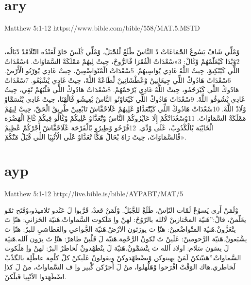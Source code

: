\documentclass[12pt,fleqn,titlepage,twoside,a4paper]{book}
\begin{document}
\section{ary}

Matthew 5:1-12 https://www.bible.com/bible/558/MAT.5.MSTD

\begin{arab}[utf]
\section*{}


وْمْلِّي شَافْ يَسُوعْ الجّْمَاعَاتْ دْ النَّاسْ طْلَعْ لْلجّْبَلْ، وْمْلِّي ݣْلَسْ جَاوْ لْعَنْدُه التّْلَامْدْ دْيَالُه، 2وْبْدَا كَيْعَلّْمْهُمْ وْݣَالْ:
3«سْعْدَاتْ الْفُقَرَا فْالرُّوحْ،
حِيتْ لِيهُمْ مَمْلَكَةْ السَّمَاوَاتْ.
4سْعْدَاتْ اللِّي كَيْبْكِيوْ، حِيتْ اللَّهْ غَادِي يْوَاسِيهُمْ.
5سْعْدَاتْ الْمْتْوَاضْعِينْ، حِيتْ غَادِي يْوَرْتُو الْأَرْضْ.
6سْعْدَاتْ هَادُوكْ اللِّي جِيعَانِينْ وْعْطْشَانِينْ لْطَاعْةْ اللَّهْ، حِيتْ غَادِي يْشْبْعُو.
7سْعْدَاتْ هَادُوكْ اللِّي كَيْرَحْمُو، حِيتْ اللَّهْ غَادِي يْرْحَمْهُمْ.
8سْعْدَاتْ هَادُوكْ اللِّي قَلْبْهُمْ نْقِي، حِيتْ غَادِي يْشُوفُو اللَّهْ.
9سْعْدَاتْ هَادُوكْ اللِّي كَيْعَاوْنُو النَّاسْ يْعِيشُو فْالْهْنَا، حِيتْ غَادِي يْتْسَمَّاوْ وْلَادْ اللَّهْ.
10سْعْدَاتْ هَادُوكْ اللِّي كَيْتّْعَدَّاوْ عْلِيهُمْ عْلَاحْقَّاشْ تَابْعِينْ طْرِيقْ الْحَقّْ، حِيتْ لِيهُمْ مَمْلَكَةْ السَّمَاوَاتْ.
11وْسْعْدَاتْكُمْ إِلَا عَايْرُوكُمْ النَّاسْ وْتّْعَدَّاوْ عْلِيكُمْ وْݣَالُو فِيكُمْ ݣَاعْ الْهَضْرَة الْخَايْبَة بْالْكْدُوبْ، عْلَى وْدِّي. 12فْرْحُو وْطِيرُو بْالْفَرْحَة عْلَاحْقَّاشْ أَجْرْكُمْ عْظِيمْ فْالسَّمَاوَاتْ، حِيتْ رَاهْ بْحَالْ هَكَّا تْعَدَّاوْ عْلَى الْأَنْبِيَا اللِّي قْبَلْ مْنّْكُمْ».
\end{arab}

\section{ayp}

Matthew 5:1-12 http://live.bible.is/bible/AYPABT/MAT/5

\begin{arab}[utf]

وْلَمَنْ أَرى يَسوُعْ لَمّات النّاِسْ، طَلَعْ للجَّبَلْ. وْلَمَنْ قعدْ، قَرَّبوا لَ عَنْدو تَلاميذو،وْفَتَح ثمّو يعَلّمنْ، قالْ:”هَنيّة المحْتازينْ لَالله بالرّوُحْ: لهنْ واِ مَلَكوت السَّماواتْ.هَنيّة الحَزانىِ: هنّاِ تَ يتْعَزَّونْ.هَنيّة المتْواضْعينْ: هنّاِ تَ يورَثون الاَرْضْ.هَنيّة الجَّواعىِ والعَطاشيِ للبرْ: هنّاِ تَ يشْبَعونْ.هَنيّة الرَّحومينْ: عَلَينْ تَ تْكونْ الرَّحْمِة.هَنيّة لَ قَلْبنْ طاهرْ: هنّاِ تَ يرَون اَلله.هَنيّة لَ يسَون سَلام: اولاد اَلله تَ يتْسَمَّونْ.هَنيّة لَ ينْطهْدونْ لَخاطرْ البرْ: لهنْ واِ مَلَكوت السَّماواتْ.”هَنيّتكنْ لَمَنْ يهينوكن وْيضْطهْدوكنْ ويقولونْ عَلَيكنْ كلْ كلْمِة عاطْلِة بالگذْبْ لَخاطري.هاك الوَقْتْ افْرَحوا وْهَلْهلوا، منْ لَ أَجرْكن گْبير واِ ف السَّماواتْ، منْ لَ كذاِ اضْطَهَدوا الاَنْبِيا قَبلْكنْ.
\end{arab}
\end{document}
